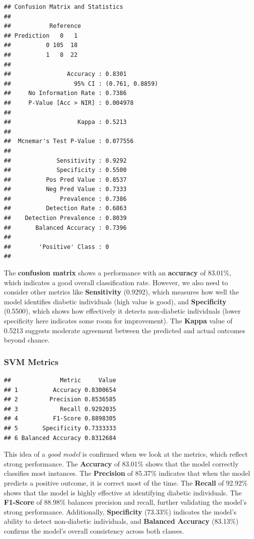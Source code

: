 \documentclass[
]{article}
\begin{document}
\begin{verbatim}
## Confusion Matrix and Statistics
## 
##           Reference
## Prediction   0   1
##          0 105  18
##          1   8  22
##                                          
##                Accuracy : 0.8301         
##                  95% CI : (0.761, 0.8859)
##     No Information Rate : 0.7386         
##     P-Value [Acc > NIR] : 0.004978       
##                                          
##                   Kappa : 0.5213         
##                                          
##  Mcnemar's Test P-Value : 0.077556       
##                                          
##             Sensitivity : 0.9292         
##             Specificity : 0.5500         
##          Pos Pred Value : 0.8537         
##          Neg Pred Value : 0.7333         
##              Prevalence : 0.7386         
##          Detection Rate : 0.6863         
##    Detection Prevalence : 0.8039         
##       Balanced Accuracy : 0.7396         
##                                          
##        'Positive' Class : 0              
## 
\end{verbatim}

The \textbf{confusion matrix} shows a performance with an
\textbf{accuracy} of 83.01\%, which indicates a good overall
classification rate. However, we also need to consider other metrics
like \textbf{Sensitivity} (0.9292), which measures how well the model
identifies diabetic individuals (high value is good), and
\textbf{Specificity} (0.5500), which shows how effectively it detects
non-diabetic individuals (lower specificity here indicates some room for
improvement). The \textbf{Kappa} value of 0.5213 suggests moderate
agreement between the predicted and actual outcomes beyond chance.

\subsubsection{SVM Metrics}\label{svm-metrics}

\begin{verbatim}
##              Metric     Value
## 1          Accuracy 0.8300654
## 2         Precision 0.8536585
## 3            Recall 0.9292035
## 4          F1-Score 0.8898305
## 5       Specificity 0.7333333
## 6 Balanced Accuracy 0.8312684
\end{verbatim}

This idea of a \emph{good model} is confirmed when we look at the
metrics, which reflect strong performance. The \textbf{Accuracy} of
83.01\% shows that the model correctly classifies most instances. The
\textbf{Precision} of 85.37\% indicates that when the model predicts a
positive outcome, it is correct most of the time. The \textbf{Recall} of
92.92\% shows that the model is highly effective at identifying diabetic
individuals. The \textbf{F1-Score} of 88.98\% balances precision and
recall, further validating the model's strong performance. Additionally,
\textbf{Specificity} (73.33\%) indicates the model's ability to detect
non-diabetic individuals, and \textbf{Balanced Accuracy} (83.13\%)
confirms the model's overall consistency across both classes.
\end{document}
